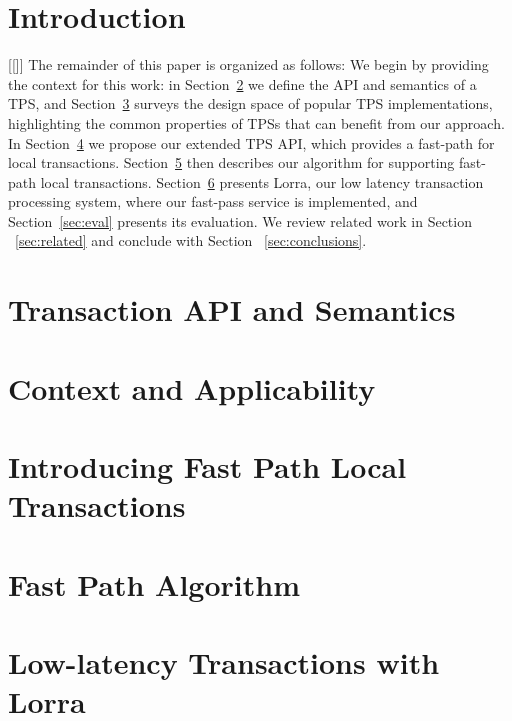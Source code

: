 \documentclass[preprint]{sigplanconf-eurosys}
\newcommand{\inred}[1]{{\color{red}{#1}}}
\newcommand{\Idit}[1]{[[\inred{Idit: #1}]]}
\newcommand{\sys}{Lorra}
\begin{document}

\section{Introduction} \label{sec:intro}


\Idit{The roadmap below is not essential; maybe replace with summary of contributions.}
The remainder of this paper is organized as follows:
We begin by providing the context for this work:   in Section~\ref{sec:api} we define the  API and semantics of a TPS, 
and    Section~\ref{sec:context} surveys  the design space of popular TPS implementations, 
highlighting the common properties of TPSs that can benefit from our approach. 
In Section~\ref{sec:new-api} we propose our extended TPS API, which provides a fast-path for local transactions. 
Section~\ref{sec:alg} then describes our algorithm for supporting fast-path local transactions.  
Section~\ref{sec:lorra} presents \sys, our low latency transaction processing system, where our fast-pass service is implemented, 
and Section~\ref{sec:eval} presents its evaluation. 
We review related work in Section ~\ref{sec:related} and conclude with Section ~\ref{sec:conclusions}.

\section{Transaction API and Semantics} \label{sec:api}


\section{Context and Applicability} \label{sec:context}


\section{Introducing Fast Path Local Transactions} \label{sec:new-api}


\section{Fast Path  Algorithm} \label{sec:alg}


\section{Low-latency Transactions with \sys} \label{sec:lorra}

\end{document}

